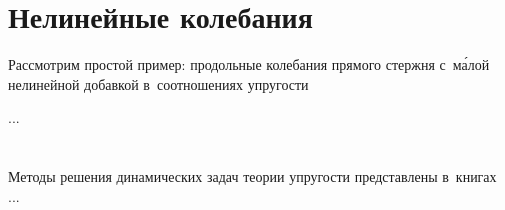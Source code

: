 \begin{otherlanguage}{russian}
\section{Нелинейные колебания}

Рассмотрим простой пример: продольные колебания прямого стержня с~м\'{а}лой нелинейной добавкой в~соотношениях упругости

...





\vspace{8mm}
\hfill\begin{minipage}[b]{0.95\linewidth}
\fontsize{10}{12}\selectfont

\section*{\wordforbibliography}

Методы решения динамических задач теории упругости представлены в~книгах ...

\end{minipage}

\end{otherlanguage}
